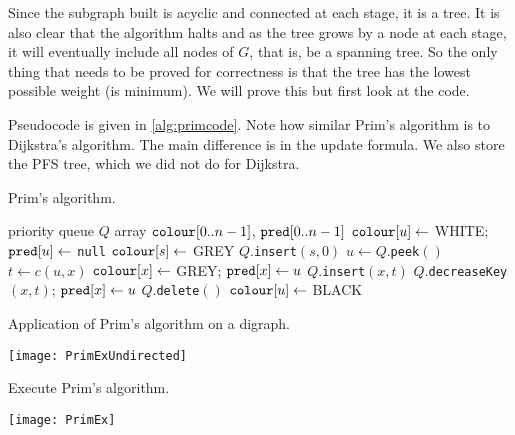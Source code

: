 Since the subgraph built is acyclic and connected at each stage, it is a tree.
It is also clear that the algorithm halts and as the tree grows by a node at each stage, 
it will eventually include all nodes of $G$, that is, be a spanning tree. 
So the only thing that needs to be proved for correctness is that the tree has the lowest possible weight (is minimum). 
We will prove this but first look at the code.

Pseudocode is given in \cref{alg:primcode}. 
Note how similar Prim's algorithm is to Dijkstra's algorithm. 
The main difference is in the update formula. We also store the PFS tree, which we did not do for Dijkstra.

\begin{algorithm}[H]
  \caption{Prim's algorithm.}
  \label{alg:primcode}
\begin{algorithmic}[1]
	\State priority queue $Q$
	\State array $\operatorname{\text{\texttt{colour}}}[0..n-1]$, $\operatorname{\text{\texttt{pred}}}[0..n-1]$
		\State $\operatorname{\text{\texttt{colour}}}[u] \gets$ WHITE; $\operatorname{\text{\texttt{pred}}}[u] \gets$ \texttt{null} 
	\EndFor
	\State $\operatorname{\text{\texttt{colour}}}[s] \gets $ GREY
	\State $Q$.\texttt{insert}$(s, 0)$
		\State $u \gets Q$.\texttt{peek}$()$
			\State $t \gets c(u, x)$
				\State $\operatorname{\text{\texttt{colour}}}[x] \gets $ GREY; $\operatorname{\text{\texttt{pred}}}[x] \gets u$
				\State $Q$.\texttt{insert}$(x, t)$
				\State $Q$.\texttt{decreaseKey}$(x, t)$; $\operatorname{\text{\texttt{pred}}}[x] \gets u$
			\EndIf
		\EndFor
		\State $Q$.\texttt{delete}$()$
		\State $\operatorname{\text{\texttt{colour}}}[u] \gets $ BLACK
	\EndWhile
	\State \Return{$\pred$}
\EndFunction
\end{algorithmic}
\end{algorithm}


\begin{Boxample}
Application of Prim's algorithm on a digraph.
\begin{center}
\texttt{[image: PrimExUndirected]}
\end{center}
\end{Boxample}

\begin{Boxample}[0.2]
Execute Prim's algorithm.\\

\begin{center}
\texttt{[image: PrimEx]}
\end{center}
\end{Boxample}

